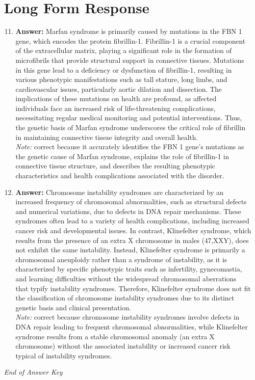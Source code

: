 \documentclass[12pt]{article}
\begin{document}
\section*{Long Form Response}
\begin{enumerate}[label=\arabic*.]
\setcounter{enumi}{10}
\item \textbf{Answer:} Marfan syndrome is primarily caused by mutations in the FBN 1 gene, which encodes the protein fibrillin-1. Fibrillin-1 is a crucial component of the extracellular matrix, playing a significant role in the formation of microfibrils that provide structural support in connective tissues. Mutations in this gene lead to a deficiency or dysfunction of fibrillin-1, resulting in various phenotypic manifestations such as tall stature, long limbs, and cardiovascular issues, particularly aortic dilation and dissection. The implications of these mutations on health are profound, as affected individuals face an increased risk of life-threatening complications, necessitating regular medical monitoring and potential interventions. Thus, the genetic basis of Marfan syndrome underscores the critical role of fibrillin in maintaining connective tissue integrity and overall health.
\\ \textit{Note:} correct because it accurately identifies the FBN 1 gene's mutations as the genetic cause of Marfan syndrome, explains the role of fibrillin-1 in connective tissue structure, and describes the resulting phenotypic characteristics and health complications associated with the disorder.
\item \textbf{Answer:} Chromosome instability syndromes are characterized by an increased frequency of chromosomal abnormalities, such as structural defects and numerical variations, due to defects in DNA repair mechanisms. These syndromes often lead to a variety of health complications, including increased cancer risk and developmental issues. In contrast, Klinefelter syndrome, which results from the presence of an extra X chromosome in males (47,XXY), does not exhibit the same instability. Instead, Klinefelter syndrome is primarily a chromosomal aneuploidy rather than a syndrome of instability, as it is characterized by specific phenotypic traits such as infertility, gynecomastia, and learning difficulties without the widespread chromosomal aberrations that typify instability syndromes. Therefore, Klinefelter syndrome does not fit the classification of chromosome instability syndromes due to its distinct genetic basis and clinical presentation.
\\ \textit{Note:} correct because chromosome instability syndromes involve defects in DNA repair leading to frequent chromosomal abnormalities, while Klinefelter syndrome results from a stable chromosomal anomaly (an extra X chromosome) without the associated instability or increased cancer risk typical of instability syndromes.
\end{enumerate}

\vfill
\noindent\textit{End of Answer Key}
\end{document}
